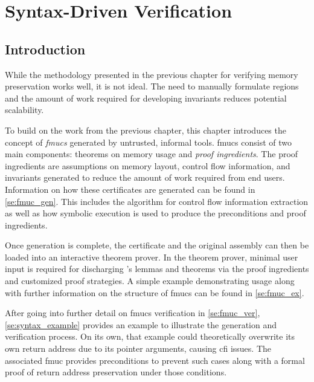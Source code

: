 \chapter{Syntax-Driven Verification} %
\section{Introduction}
While the methodology presented in the previous chapter
for verifying memory preservation works well, it is not ideal.
The need to manually formulate regions
and the amount of work required for developing invariants reduces potential scalability.

To build on the work from the previous chapter,
this chapter introduces the concept of \emph{\acp{fmuc}}
generated by untrusted, informal tools.
\Acp{fmuc} consist of two main components:
theorems on memory usage and \emph{proof ingredients}.
The proof ingredients are assumptions on memory layout,
control flow information, and invariants
generated to reduce the amount of work required from end users.
Information on how these certificates are generated can be found in \cref{se:fmuc_gen}.
This includes the algorithm for control flow information extraction
as well as how symbolic execution is used
to produce the preconditions and proof ingredients.

Once generation is complete, the certificate and the original assembly
can then be loaded into an interactive theorem prover.
In the theorem prover,
minimal user input is required for discharging 's lemmas and theorems
via the proof ingredients and customized proof strategies.
A simple example demonstrating usage along with 
further information on the structure of \acp{fmuc} can be found in \cref{se:fmuc_ex}.

After going into further detail on \acp{fmuc} verification in \cref{se:fmuc_ver},
\cref{se:syntax_example} provides an example to illustrate the generation
and verification process.
On its own, that example could theoretically overwrite its own return address
due to its pointer arguments, causing \ac{cfi} issues.
The associated \ac{fmuc} provides preconditions to prevent such cases
along with a formal proof of return address preservation under those conditions. 

